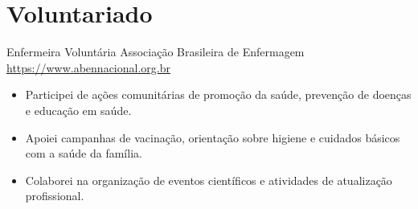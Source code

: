 \documentclass[a4paper, serif, 10pt]{moderncv}
\begin{document}
\section{Voluntariado}

        {Enfermeira Voluntária}
        {Associação Brasileira de Enfermagem}
        {\url{https://www.abennacional.org.br}}
        {}
        {\begin{itemize}
\item Participei de ações comunitárias de promoção da saúde, prevenção de doenças e educação em saúde.
\item Apoiei campanhas de vacinação, orientação sobre higiene e cuidados básicos com a saúde da família.
\item Colaborei na organização de eventos científicos e atividades de atualização profissional.
\end{itemize}}
    
\end{document}
